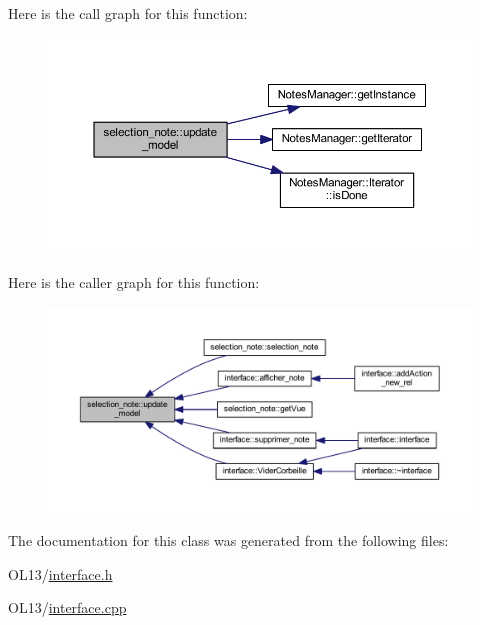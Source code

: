 Here is the call graph for this function\+:\nopagebreak
\begin{figure}[H]
\begin{center}
\leavevmode
\includegraphics[width=350pt]{classselection__note_aab004424eba4264628d2e01108f2e63b_cgraph}
\end{center}
\end{figure}
Here is the caller graph for this function\+:\nopagebreak
\begin{figure}[H]
\begin{center}
\leavevmode
\includegraphics[width=350pt]{classselection__note_aab004424eba4264628d2e01108f2e63b_icgraph}
\end{center}
\end{figure}


The documentation for this class was generated from the following files\+:\begin{DoxyCompactItemize}
\item 
O\+L13/\hyperlink{interface_8h}{interface.\+h}\item 
O\+L13/\hyperlink{interface_8cpp}{interface.\+cpp}\end{DoxyCompactItemize}
